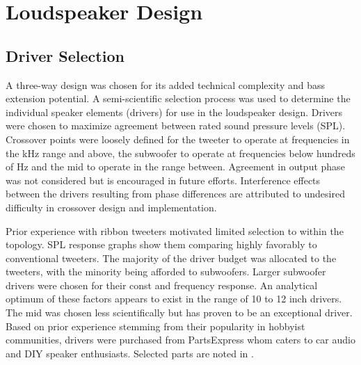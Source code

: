 \section{Loudspeaker Design}
%
\subsection{Driver Selection}
A three-way design was chosen for its added technical complexity and bass extension potential. A semi-scientific selection process was used to determine the individual speaker elements (drivers) for use in the loudspeaker design. Drivers were chosen to maximize agreement between rated sound pressure levels (SPL). Crossover points were loosely defined for the tweeter to operate at frequencies in the \si{\kilo\hertz} range and above, the subwoofer to operate at frequencies below hundreds of \si{Hz} and the mid to operate in the range between. Agreement in output phase was not considered but is encouraged in future efforts. Interference effects between the drivers resulting from phase differences are attributed to undesired difficulty in crossover design and implementation. \par
%
Prior experience with ribbon tweeters motivated limited selection to within the topology. SPL response graphs show them comparing highly favorably to conventional tweeters. The majority of the driver budget was allocated to the tweeters, with the minority being afforded to subwoofers. Larger subwoofer drivers were chosen for their const and frequency response. An analytical optimum of these factors appears to exist in the range of 10 to 12 inch drivers. The mid was chosen less scientifically but has proven to be an exceptional driver. Based on prior experience stemming from their popularity in hobbyist communities, drivers were purchased from PartsExpress whom caters to car audio and DIY speaker enthusiasts. Selected parts are noted in .\par
%
